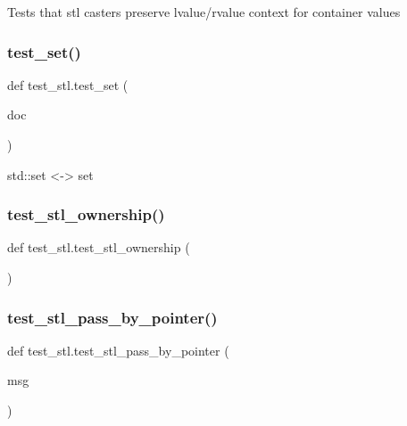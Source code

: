\begin{DoxyVerb}Tests that stl casters preserve lvalue/rvalue context for container values\end{DoxyVerb}
 \mbox{\label{namespacetest__stl_abe691892c7f31972b423f19ddfe83b58}} 
\subsubsection{\texorpdfstring{test\_set()}{test\_set()}}
{\footnotesize\ttfamily def test\+\_\+stl.\+test\+\_\+set (\begin{DoxyParamCaption}\item[{}]{doc }\end{DoxyParamCaption})}

\begin{DoxyVerb}std::set <-> set\end{DoxyVerb}
 \mbox{\label{namespacetest__stl_a5fa652434f62df731621b390751b09a8}} 
\subsubsection{\texorpdfstring{test\_stl\_ownership()}{test\_stl\_ownership()}}
{\footnotesize\ttfamily def test\+\_\+stl.\+test\+\_\+stl\+\_\+ownership (\begin{DoxyParamCaption}{ }\end{DoxyParamCaption})}

\mbox{\label{namespacetest__stl_ad34d2165b825e5f9f29bf7805f14dca5}} 
\subsubsection{\texorpdfstring{test\_stl\_pass\_by\_pointer()}{test\_stl\_pass\_by\_pointer()}}
{\footnotesize\ttfamily def test\+\_\+stl.\+test\+\_\+stl\+\_\+pass\+\_\+by\+\_\+pointer (\begin{DoxyParamCaption}\item[{}]{msg }\end{DoxyParamCaption})}

